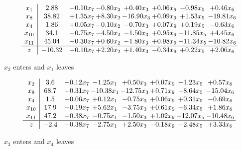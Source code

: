 \documentclass[8pt]{article}
\begin{document}
 \[\begin{array}{c| c c@{\hskip 2pt} c@{\hskip 2pt} c@{\hskip 2pt} c@{\hskip 2pt} c@{\hskip 2pt} c@{\hskip 2pt} }
 x_{1}   &  2.88 & -0.10 x_{7} & -0.80 x_{2} & +  0.40 x_{3} & +  0.06 x_{9} & -0.98 x_{5} & +  0.46 x_{6}\\
 x_{8}   &  38.82 & +  1.35 x_{7} & +  8.30 x_{2} & -16.90 x_{3} & +  0.09 x_{9} & +  1.53 x_{5} & -19.81 x_{6}\\
 x_{4}   &  1.86 & +  0.05 x_{7} & -0.10 x_{2} & -0.70 x_{3} & +  0.07 x_{9} & +  0.19 x_{5} & -0.63 x_{6}\\
 x_{10}   &  34.1 & -0.75 x_{7} & -4.50 x_{2} & -1.50 x_{3} & +  0.95 x_{9} & -11.85 x_{5} & +  4.45 x_{6}\\
 x_{11}   &  45.04 & -0.30 x_{7} & +  0.60 x_{2} & -1.80 x_{3} & +  0.98 x_{9} & -11.34 x_{5} & -10.82 x_{6}\\
\hline
z    &  -10.32 & -0.10 x_{7} & +  2.20 x_{2} & +  1.40 x_{3} & -0.34 x_{9} & +  0.22 x_{5} & +  2.06 x_{6}\\
\end{array}\]


 $ x_{2} $ enters and $ x_{1} $ leaves 

 \[\begin{array}{c| c c@{\hskip 2pt} c@{\hskip 2pt} c@{\hskip 2pt} c@{\hskip 2pt} c@{\hskip 2pt} c@{\hskip 2pt} }
 x_{2}   &  3.6 & -0.12 x_{7} & -1.25 x_{1} & +  0.50 x_{3} & +  0.07 x_{9} & -1.23 x_{5} & +  0.57 x_{6}\\
 x_{8}   &  68.7 & +  0.31 x_{7} & -10.38 x_{1} & -12.75 x_{3} & +  0.71 x_{9} & -8.64 x_{5} & -15.04 x_{6}\\
 x_{4}   &  1.5 & +  0.06 x_{7} & +  0.12 x_{1} & -0.75 x_{3} & +  0.06 x_{9} & +  0.31 x_{5} & -0.69 x_{6}\\
 x_{10}   &  17.9 & -0.19 x_{7} & +  5.62 x_{1} & -3.75 x_{3} & +  0.61 x_{9} & -6.34 x_{5} & +  1.86 x_{6}\\
 x_{11}   &  47.2 & -0.38 x_{7} & -0.75 x_{1} & -1.50 x_{3} & +  1.02 x_{9} & -12.07 x_{5} & -10.48 x_{6}\\
\hline
z    &  -2.4 & -0.38 x_{7} & -2.75 x_{1} & +  2.50 x_{3} & -0.18 x_{9} & -2.48 x_{5} & +  3.33 x_{6}\\
\end{array}\]


 $ x_{3} $ enters and $ x_{4} $ leaves 
\end{document}
